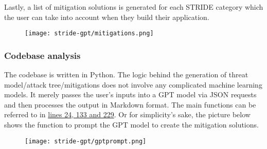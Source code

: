 Lastly, a list of mitigation solutions is generated for each STRIDE category which the user can take into account when they build their application.
\begin{figure}[htbp]
    \centering
    \texttt{[image: stride-gpt/mitigations.png]}
\end{figure}

\subsubsection*{Codebase analysis}
The codebase is written in Python. The logic behind the generation of threat model/attack tree/mitigations does not involve any complicated machine learning models. It merely passes the user's inputs into a GPT model via JSON requests and then processes the output in Markdown format. The main functions can be referred to in \href{https://github.com/mrwadams/stride-gpt/blob/master/main.py}{lines 24, 133 and 229}. Or for simplicity's sake, the picture below shows the function to prompt the GPT model to create the mitigation solutions.
\begin{figure}[htbp]
    \centering
    \texttt{[image: stride-gpt/gptprompt.png]}
\end{figure}